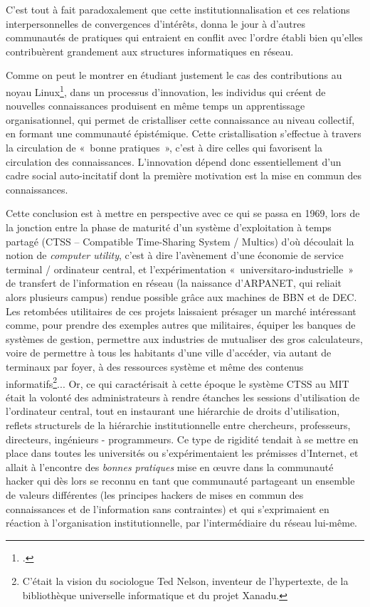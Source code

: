 \documentclass{FramateX}
\begin{document}
\begin{refsection}
C'est tout à fait paradoxalement que cette institutionnalisation et ces
relations interpersonnelles de convergences d'intérêts, donna le jour
à d'autres communautés de pratiques qui entraient en conflit avec
l'ordre établi bien qu'elles contribuèrent grandement aux structures
informatiques en réseau.

Comme on peut le montrer en étudiant justement le cas des contributions
au noyau Linux\footnote{\cite{cohendetinnovation2003}.}, dans un processus
d'innovation, les individus qui créent de nouvelles
connaissances produisent en même temps un apprentissage
organisationnel, qui permet de cristalliser cette connaissance au
niveau collectif, en formant une communauté épistémique. Cette
cristallisation s'effectue à travers la circulation de
«~bonne pratiques~», c'est à dire celles qui
favorisent la circulation des connaissances.
L'innovation dépend donc essentiellement
d'un cadre social auto-incitatif dont la première
motivation est la mise en commun des connaissances. 

Cette conclusion est à mettre en perspective avec ce qui se passa en
1969, lors de la jonction entre la phase de maturité d'un système
d'exploitation à temps partagé (CTSS -- Compatible Time-Sharing
System / Multics) d'où découlait la notion de \textit{computer
utility}, c'est à dire l'avènement d'une économie de service terminal /
ordinateur central, et l'expérimentation
«~universitaro-industrielle~» de transfert de l'information en réseau
(la naissance d'ARPANET, qui reliait alors plusieurs campus) rendue
possible grâce aux machines de BBN et de DEC. Les retombées utilitaires
de ces projets laissaient présager un marché intéressant comme, pour
prendre des exemples autres que militaires, équiper les banques de
systèmes de gestion, permettre aux industries de mutualiser des gros
calculateurs, voire de permettre à tous les habitants d'une ville
d'accéder, via autant de terminaux par foyer, à des ressources système
et même des contenus informatifs\footnote{C'était la
vision du sociologue Ted Nelson, inventeur de
l'hypertexte, de la bibliothèque universelle
informatique et du projet Xanadu.}... Or, ce qui caractérisait à cette
époque le système CTSS au MIT était la volonté des administrateurs à
rendre étanches les sessions d'utilisation de l'ordinateur central,
tout en instaurant une hiérarchie de droits d'utilisation, reflets
structurels de la hiérarchie institutionnelle entre chercheurs,
professeurs, directeurs, ingénieurs - programmeurs. Ce type de rigidité
tendait à se mettre en place dans toutes les universités ou
s'expérimentaient les prémisses d'Internet, et allait à l'encontre des
\textit{bonnes pratiques} mise en œuvre dans la communauté hacker qui
dès lors se reconnu en tant que communauté partageant un ensemble de
valeurs différentes (les principes hackers de mises en commun des
connaissances et de l'information sans contraintes) et qui
s'exprimaient en réaction à l'organisation institutionnelle, par
l'intermédiaire du réseau lui-même. 


\end{refsection}
\end{document}
